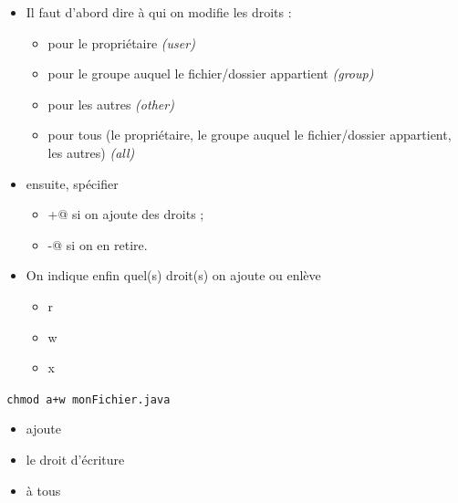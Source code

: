 \documentclass[11pt,a4paper]{article}
\begin{document}
					\begin{itemize}
				
			\item 
					    Il faut d'abord dire \`a qui on modifie les droits :
					    
					\begin{itemize}
				
			\item \verb@u@ pour le propri\'etaire \textit{(user)}
			\item \verb@g@ pour le groupe auquel le fichier/dossier appartient \textit{(group)}
			\item \verb@o@ pour les autres \textit{(other)}
			\item \verb@a@ pour tous (le propri\'etaire, le groupe auquel le fichier/dossier appartient, les autres) \textit{(all)}
					\end{itemize}
				
			\item 
              ensuite, sp\'ecifier 
              
					\begin{itemize}
				
			\item \verb@+@ si on ajoute des droits ;
			\item \verb@-@ si on en retire.
					\end{itemize}
				
			\item 
              On indique enfin quel(s) droit(s) on ajoute ou enl\`eve 
                
					\begin{itemize}
				
			\item r
			\item w
			\item x
					\end{itemize}
				
					\end{itemize}
				
            \par
        \,\verb|chmod a+w monFichier.java|\,
					\begin{itemize}
				
			\item ajoute
			\item le droit d'\'ecriture
			\item \`a tous
					\end{itemize}
				
\end{document}
